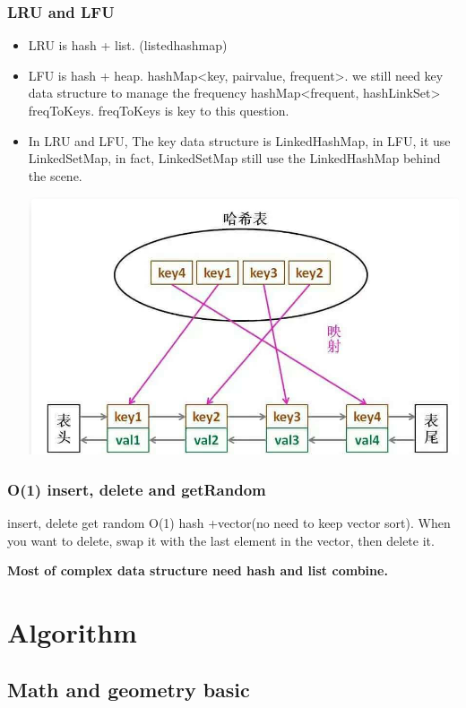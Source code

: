 \documentclass[a4paper,11pt,twoside]{book}
\begin{document}
\subsection{LRU and LFU}
\begin{itemize}
	\item  LRU is hash + list. (listedhashmap)
	\item  LFU is hash + heap. hashMap<key, pair{value, frequent}>. we still need key data structure to manage the frequency hashMap<frequent, hashLinkSet> freqToKeys.  freqToKeys is key to this question. 
	
	\item In LRU and LFU, The key data structure is LinkedHashMap, in LFU, it use LinkedSetMap, in fact, LinkedSetMap still use the LinkedHashMap behind the scene. 
\begin{center}
	\includegraphics[width=0.7\linewidth]{pics/LinkedHashMap}
\end{center}
	
\end{itemize}

	
\subsection{O(1) insert, delete and getRandom}
insert, delete get random O(1)  hash +vector(no need to keep vector sort). When you want to delete, swap it with the last element in the vector, then delete it. 

\textbf{Most of complex data structure need hash and list combine.}
	

\chapter{Algorithm}
\section{Math and geometry basic}
\end{document}
